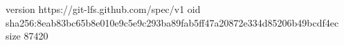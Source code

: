 version https://git-lfs.github.com/spec/v1
oid sha256:8eab83bc65b8e010e9c5e9c293ba89fab5ff47a20872e334d85206b49bcdf4ec
size 87420
